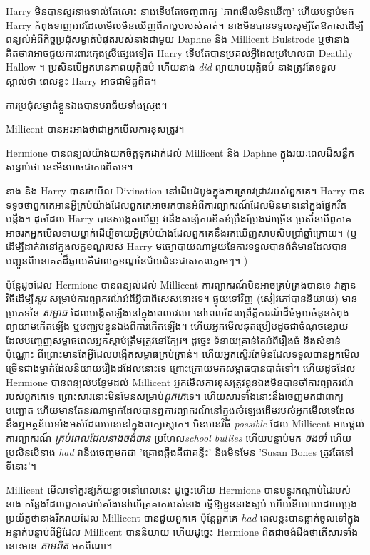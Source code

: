 {{{{{Harry មិន​បាន​សួរ​នាង​ទាល់​តែ​សោះ នាង​ទើប​តែ​ចេញ​ពាក្យ 'ភាព​មើល​មិន​ឃើញ' ហើយ​បន្ទាប់​មក Harry កំពុង​ទាញ​អាវ​ដែល​មើល​មិន​ឃើញ​ពី​កាបូប​របស់​គាត់។ នាងមិនបានទទួលសូម្បីតែឱកាសដើម្បីពន្យល់អំពីកិច្ចប្រជុំសម្ងាត់បំផុតរបស់នាងជាមួយ Daphne និង Millicent Bulstrode ឬថានាងគិតថាវាអាចជួយការពារក្មេងស្រីផ្សេងទៀត Harry ទើបតែបានប្រគល់អ្វីដែលប្រហែលជា Deathly Hallow ។ ប្រសិនបើអ្នកមានភាពយុត្តិធម៌ ហើយនាង \emph{did} ព្យាយាមយុត្តិធម៌ នាងត្រូវតែទទួលស្គាល់ថា ពេលខ្លះ Harry អាចជាមិត្តពិត។

ការប្រជុំសម្ងាត់ខ្លួនឯងបានបរាជ័យទាំងស្រុង។

Millicent បានអះអាងថាជាអ្នកមើលការខុសត្រូវ។

Hermione បានពន្យល់យ៉ាងយកចិត្តទុកដាក់ដល់ Millicent និង Daphne ក្នុងរយៈពេលដ៏សន្ធឹកសន្ធាប់ថា នេះមិនអាចជាការពិតទេ។

នាង និង Harry បានរកមើល Divination នៅដើមដំបូងក្នុងការស្រាវជ្រាវរបស់ពួកគេ។ Harry បានទទូចថាពួកគេអានអ្វីគ្រប់យ៉ាងដែលពួកគេអាចរកបានអំពីការព្យាករណ៍ដែលមិនមាននៅក្នុងផ្នែករឹតបន្តឹង។ ដូចដែល Harry បានសង្កេតឃើញ វានឹងសន្សំការខិតខំប្រឹងប្រែងជាច្រើន ប្រសិនបើពួកគេអាចរកអ្នកមើលទាយម្នាក់ដើម្បីទាយអ្វីគ្រប់យ៉ាងដែលពួកគេនឹងរកឃើញសាមសិបប្រាំឆ្នាំក្រោយ។ (ឬដើម្បីដាក់វានៅក្នុងលក្ខខណ្ឌរបស់ Harry មធ្យោបាយណាមួយនៃការទទួលបានព័ត៌មានដែលបានបញ្ជូនពីអនាគតដ៏ឆ្ងាយគឺជាលក្ខខណ្ឌនៃជ័យជំនះជាសកលភ្លាមៗ។ )

ប៉ុន្តែដូចដែល Hermione បានពន្យល់ដល់ Millicent ការព្យាករណ៍មិនអាចគ្រប់គ្រងបានទេ វាគ្មានវិធីដើម្បី\emph{សួរ} សម្រាប់ការព្យាករណ៍អំពីអ្វីជាពិសេសនោះទេ។ ផ្ទុយទៅវិញ (សៀវភៅបាននិយាយ) មានប្រភេទនៃ \emph{សម្ពាធ} ដែលបង្កើតឡើងនៅក្នុងពេលវេលា នៅពេលដែលព្រឹត្តិការណ៍ដ៏ធំមួយចំនួនកំពុងព្យាយាមកើតឡើង ឬបញ្ឈប់ខ្លួនឯងពីការកើតឡើង។ ហើយ​អ្នក​មើល​ឆុត​ប្រៀប​ដូច​ជា​ចំណុច​ខ្សោយ​ដែល​បញ្ចេញ​សម្ពាធ​ពេល​អ្នក​ស្តាប់​ត្រឹមត្រូវ​នៅ​ក្បែរ។ ដូច្នេះ ទំនាយគ្រាន់តែអំពីរឿងធំ និងសំខាន់ប៉ុណ្ណោះ ពីព្រោះមានតែអ្វីដែលបង្កើតសម្ពាធគ្រប់គ្រាន់។ ហើយ​អ្នក​ស្ទើរតែ​មិន​ដែល​ទទួល​បាន​អ្នក​មើល​ច្រើន​ជាង​ម្នាក់​ដែល​និយាយ​រឿង​ដដែល​នោះ​ទេ ព្រោះ​ក្រោយ​មក​សម្ពាធ​បាន​បាត់​ទៅ។ ហើយដូចដែល Hermione បានពន្យល់បន្ថែមដល់ Millicent អ្នកមើលការខុសត្រូវខ្លួនឯងមិនបានចាំការព្យាករណ៍របស់ពួកគេទេ ព្រោះសារនោះមិនមែនសម្រាប់\emph{ពួកគេ}ទេ។ ហើយសារទាំងនោះនឹងចេញមកជាពាក្យបញ្ឆោត ហើយមានតែនរណាម្នាក់ដែលបានឮការព្យាករណ៍នៅក្នុងសំឡេងដើមរបស់អ្នកមើលទេដែលនឹងឮអត្ថន័យទាំងអស់ដែលមាននៅក្នុងពាក្យស្លោក។ មិនមានវិធី \emph{possible} ដែល Millicent អាចផ្តល់ការព្យាករណ៍ \emph{គ្រប់ពេលដែលនាងចង់បាន} ប្រហែល\emph{school bullies} ហើយបន្ទាប់មក \emph{ចងចាំ} ហើយប្រសិនបើនាង \emph{had} វានឹងចេញមកជា 'គ្រោងឆ្អឹងគឺជាគន្លឹះ' និងមិនមែន 'Susan Bones ត្រូវតែនៅទីនោះ'។

Millicent មើលទៅគួរឱ្យភ័យខ្លាចនៅពេលនេះ ដូច្នេះហើយ Hermione បានបន្ធូរកណ្តាប់ដៃរបស់នាង កន្លែងដែលពួកគេជាប់គាំងនៅលើត្រគាករបស់នាង ធ្វើឱ្យខ្លួននាងស្ងប់ ហើយនិយាយដោយប្រុងប្រយ័ត្នថានាងរីករាយដែល Millicent បានជួយពួកគេ ប៉ុន្តែពួកគេ \emph{had} ពេលខ្លះបានធ្លាក់ចូលទៅក្នុងអន្ទាក់បន្ទាប់ពីអ្វីដែល Millicent បាននិយាយ ហើយដូច្នេះ Hermione ពិតជាចង់ដឹងថាតើសារទាំងនោះមាន \emph{តាមពិត} មកពីណា។

}}}}}
